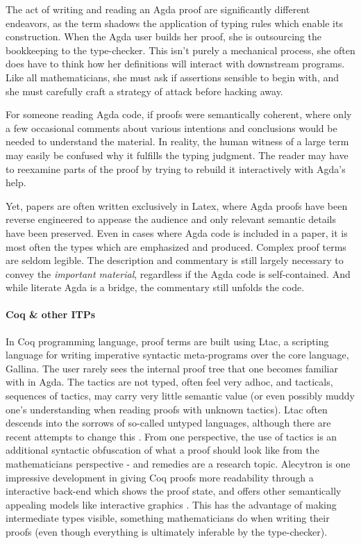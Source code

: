 The act of writing and reading an Agda proof are significantly different
endeavors, as the term shadows the application of typing rules which enable its
construction. When the Agda user builds her proof, she is outsourcing the
bookkeeping to the type-checker. This isn't purely a mechanical process, she
often does have to think how her definitions will interact with downstream
programs. Like all mathematicians, she must ask if assertions sensible to begin
with, and she must carefully craft a strategy of attack before hacking away.

For someone reading Agda code, if proofs were semantically coherent, where only
a few occasional comments about various intentions and conclusions
would be needed to understand the material. In reality, the human witness of a
large term may easily be confused why it fulfills the typing judgment.
The reader may have to reexamine parts of the proof by trying to rebuild it
interactively with Agda's help.

Yet, papers are often written exclusively in Latex, where Agda proofs have been
reverse engineered to appease the audience and only relevant semantic details
have been preserved. Even in cases where Agda code is included in a paper, it is
most often the types which are emphasized and produced. Complex proof terms are
seldom legible. The description and commentary is still largely necessary to
convey the \emph{important material}, regardless if the Agda code is
self-contained. And while literate Agda is a bridge, the commentary still
unfolds the code.

\paragraph{Coq & other ITPs}

In Coq programming language, proof terms are built using Ltac, a scripting
language for writing imperative syntactic meta-programs over the core language,
Gallina. The user rarely sees the internal proof tree that one becomes familiar
with in Agda. The tactics are not typed, often feel very adhoc, and tacticals,
sequences of tactics, may carry very little semantic value (or even possibly
muddy one's understanding when reading proofs with unknown tactics). Ltac often
descends into the sorrows of so-called untyped languages, although there are
recent attempts to change this \cite{mtac2} \cite{ltac2}. From one perspective,
the use of tactics is an additional syntactic obfuscation of what a proof should
look like from the mathematicians perspective - and remedies are a research
topic. Alecytron is one impressive development in giving Coq proofs more
readability through a interactive back-end which shows the proof state, and
offers other semantically appealing models like interactive graphics
\cite{coqAlec}. This has the advantage of making intermediate types visible,
something mathematicians do when writing their proofs (even though everything is
ultimately inferable by the type-checker).

